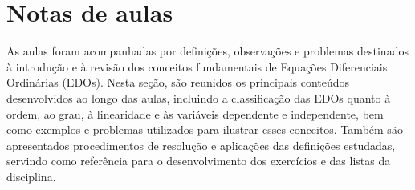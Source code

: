 \section{Notas de aulas}

As aulas foram acompanhadas por definições, observações e problemas destinados
à introdução e à revisão dos conceitos fundamentais de Equações Diferenciais
Ordinárias (EDOs). Nesta seção, são reunidos os principais conteúdos
desenvolvidos ao longo das aulas, incluindo a classificação das EDOs quanto à
ordem, ao grau, à linearidade e às variáveis dependente e independente, bem
como exemplos e problemas utilizados para ilustrar esses conceitos. Também são
apresentados procedimentos de resolução e aplicações das definições estudadas,
servindo como referência para o desenvolvimento dos exercícios e das listas da
disciplina.



\newpage


